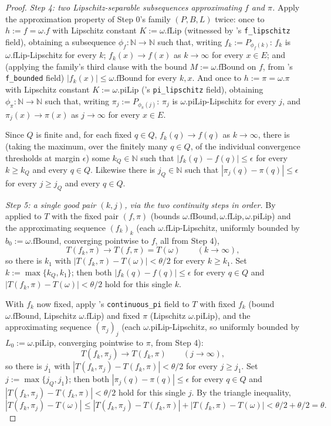 \begin{proof}
  \emph{Step 4: two Lipschitz-separable subsequences approximating $f$ and $\pi$.} Apply the
  approximation property of Step 0's family $(P,B,L)$ twice: once to $h:=f=\omega.f$ with Lipschitz
  constant $K:=\omega.\mathrm{fLip}$ (witnessed by 's \texttt{f\_lipschitz} field),
  obtaining a subsequence $\phi_f\colon\mathbb{N}\to\mathbb{N}$ such that, writing
  $f_k:=P_{\phi_f(k)}$: $f_k$ is $\omega.\mathrm{fLip}$-Lipschitz for every $k$; $f_k(x)\to f(x)$ as
  $k\to\infty$ for every $x\in E$; and (applying the family's third clause with the bound
  $M:=\omega.\mathrm{fBound}$ on $f$, from 's \texttt{f\_bounded} field)
  $|f_k(x)|\le\omega.\mathrm{fBound}$ for every $k,x$. And once to $h:=\pi=\omega.\pi$ with
  Lipschitz constant $K:=\omega.\mathrm{piLip}$ ('s \texttt{pi\_lipschitz} field),
  obtaining $\phi_\pi\colon\mathbb{N}\to\mathbb{N}$ such that, writing $\pi_j:=P_{\phi_\pi(j)}$:
  $\pi_j$ is $\omega.\mathrm{piLip}$-Lipschitz for every $j$, and $\pi_j(x)\to\pi(x)$ as
  $j\to\infty$ for every $x\in E$.

  Since $Q$ is finite and, for each fixed $q\in Q$, $f_k(q)\to f(q)$ as $k\to\infty$, there is
  (taking the maximum, over the finitely many $q\in Q$, of the individual convergence thresholds at
  margin $\epsilon$) some $k_Q\in\mathbb{N}$ such that $|f_k(q)-f(q)|\le\epsilon$ for every $k\ge
  k_Q$ and every $q\in Q$. Likewise there is $j_Q\in\mathbb{N}$ such that $|\pi_j(q)-\pi(q)|\le
  \epsilon$ for every $j\ge j_Q$ and every $q\in Q$.

  \emph{Step 5: a single good pair $(k,j)$, via the two continuity steps in order.} By
   applied to $T$ with the fixed pair $(f,\pi)$ (bounds
  $\omega.\mathrm{fBound},\omega.\mathrm{fLip},\omega.\mathrm{piLip}$) and the approximating
  sequence $(f_k)_{k}$ (each $\omega.\mathrm{fLip}$-Lipschitz, uniformly bounded by
  $b_0:=\omega.\mathrm{fBound}$, converging pointwise to $f$, all from Step 4),
  \[
    T(f_k,\pi) \longrightarrow T(f,\pi) = T(\omega) \qquad (k\to\infty)
    ,
  \]
  so there is $k_1$ with $|T(f_k,\pi)-T(\omega)| < \theta/2$ for every $k\ge k_1$. Set
  $k:=\max\{k_Q,k_1\}$; then both $|f_k(q)-f(q)|\le\epsilon$ for every $q\in Q$ and
  $|T(f_k,\pi)-T(\omega)|<\theta/2$ hold for this single $k$.

  With $f_k$ now fixed, apply 's \texttt{continuous\_pi} field to $T$ with
  fixed $f_k$ (bound $\omega.\mathrm{fBound}$, Lipschitz $\omega.\mathrm{fLip}$) and fixed $\pi$
  (Lipschitz $\omega.\mathrm{piLip}$), and the approximating sequence $(\pi_j)_j$ (each
  $\omega.\mathrm{piLip}$-Lipschitz, so uniformly bounded by $L_0:=\omega.\mathrm{piLip}$,
  converging pointwise to $\pi$, from Step 4):
  \[
    T(f_k,\pi_j) \longrightarrow T(f_k,\pi) \qquad (j\to\infty)
    ,
  \]
  so there is $j_1$ with $|T(f_k,\pi_j)-T(f_k,\pi)|<\theta/2$ for every $j\ge j_1$. Set
  $j:=\max\{j_Q,j_1\}$; then both $|\pi_j(q)-\pi(q)|\le\epsilon$ for every $q\in Q$ and
  $|T(f_k,\pi_j)-T(f_k,\pi)|<\theta/2$ hold for this single $j$. By the triangle inequality,
  \[
    |T(f_k,\pi_j) - T(\omega)|
    \le |T(f_k,\pi_j)-T(f_k,\pi)| + |T(f_k,\pi)-T(\omega)|
    < \theta/2+\theta/2 = \theta
    . \tag{5.1}
  \]


\end{proof}
